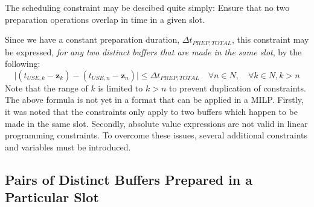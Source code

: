 The scheduling constraint may be descibed quite simply:
Ensure that no two preparation operations overlap in time in a given slot.

Since we have a constant preparation duration, $ \Delta t_{PREP,TOTAL} $, this
constraint may be expressed, \emph{for any two distinct buffers that are made
in the same slot}, by the following:
\begin{equation}
    \lvert \left( t_{USE,k} - \boldsymbol{z}_{k} \right) - \left( t_{USE,n} -
    \boldsymbol{z}_{n} \right) \rvert \le \Delta t_{PREP,TOTAL} \quad \forall n
    \in N, \quad \forall k \in N, k > n
\end{equation}
Note that the range of $ k $ is limited to $ k > n $ to prevent duplication
of constraints.
The above formula is not yet in a format that can be applied in a MILP.
Firstly, it was noted that the constraints only apply to two buffers which
happen to be made in the same slot.
Secondly, absolute value expressions are not valid in linear programming
constraints.
To overcome these issues, several additional constraints and variables must be
introduced.

\subsection{Pairs of Distinct Buffers Prepared in a Particular Slot}\label{SS.constr6}

